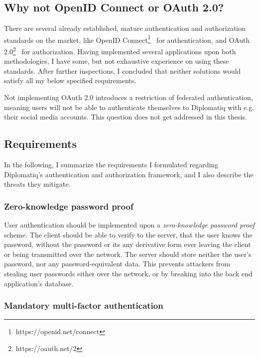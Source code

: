 \subsection{Why not OpenID Connect or OAuth 2.0?}

There are several already established, mature authentication and authorization standards on the market, like OpenID Connect\footnote{https://openid.net/connect}~\cite{openid-connect-core} for authentication, and OAuth 2.0\footnote{https://oauth.net/2}~\cite{rfc6749} for authorization. Having implemented several applications upon both methodologies, I have some, but not exhaustive experience on using these standards. After further inspections, I concluded that neither solutions would satisfy all my below specified requirements.

Not implementing OAuth 2.0 introduces a restriction of federated authentication, meaning users will not be able to authenticate themselves to Diplomatiq with e.g. their social media accounts. This question does not get addressed in this thesis.

\subsection{Requirements}

In the following, I summarize the requirements I formulated regarding Diplomatiq's authentication and authorization framework, and I also describe the threats they mitigate.

\subsubsection{Zero-knowledge password proof}

User authentication should be implemented upon a \emph{zero-knowledge password proof} scheme. The client should be able to verify to the server, that the user knows the password, without the password or its any derivative form ever leaving the client or being transmitted over the network. The server should store neither the user's password, nor any password-equivalent data. This prevents attackers from stealing user passwords either over the network, or by breaking into the back end application's database.

\subsubsection{Mandatory multi-factor authentication}

